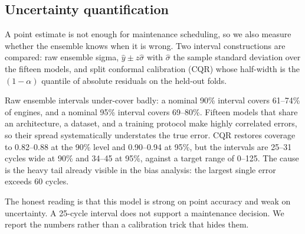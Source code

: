 
\subsection{Uncertainty quantification}

A point estimate is not enough for maintenance scheduling, so we also measure
whether the ensemble knows when it is wrong. Two interval constructions are
compared: raw ensemble sigma, $\hat y\pm z\hat\sigma$ with $\hat\sigma$ the
sample standard deviation over the fifteen models, and split conformal
calibration (CQR) whose half-width is the $(1-\alpha)$ quantile of absolute
residuals on the held-out folds.

Raw ensemble intervals under-cover badly: a nominal 90\% interval covers
61--74\% of engines, and a nominal 95\% interval covers 69--80\%. Fifteen
models that share an architecture, a dataset, and a training protocol make
highly correlated errors, so their spread systematically understates the true
error. CQR restores coverage to 0.82--0.88 at the 90\% level and 0.90--0.94 at
95\%, but the intervals are 25--31 cycles wide at 90\% and 34--45 at 95\%,
against a target range of 0--125. The cause is the heavy tail already visible
in the bias analysis: the largest single error exceeds 60 cycles.

The honest reading is that this model is strong on point accuracy and weak on
uncertainty. A 25-cycle interval does not support a maintenance decision. We
report the numbers rather than a calibration trick that hides them.
